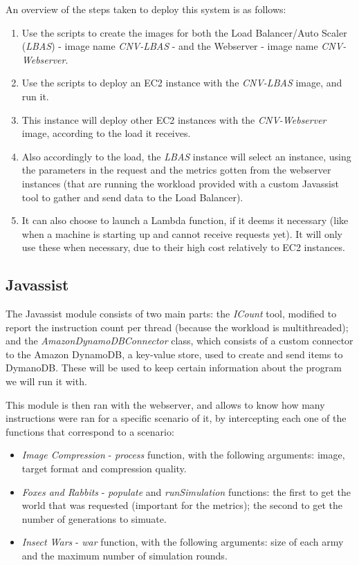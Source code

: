 \documentclass{article}
\begin{document}
An overview of the steps taken to deploy this system is as follows:

\begin{enumerate}
    \item Use the scripts to create the images for both the Load Balancer/Auto
        Scaler (\textit{LBAS}) - image name \textit{CNV-LBAS} - and the
        Webserver - image name \textit{CNV-Webserver}.
    \item Use the scripts to deploy an EC2 instance with the \textit{CNV-LBAS}
        image, and run it.
    \item This instance will deploy other EC2 instances with the
        \textit{CNV-Webserver} image, according to the load it receives.
    \item Also accordingly to the load, the \textit{LBAS} instance will select
        an instance, using the parameters in the request and the metrics gotten
        from the webserver instances (that are running the workload provided
        with a custom Javassist tool to gather and send data to the Load
        Balancer).
    \item It can also choose to launch a Lambda function, if it deems it
        necessary (like when a machine is starting up and cannot receive
        requests yet). It will only use these when necessary, due to their high
        cost relatively to EC2 instances.
\end{enumerate}

\subsection{Javassist}

The Javassist module consists of two main parts: the \textit{ICount} tool,
modified to report the instruction count per thread (because the workload is
multithreaded); and the \textit{AmazonDynamoDBConnector} class, which consists
of a custom connector to the Amazon DynamoDB, a key-value store, used to create
and send items to DymanoDB. These will be used to keep certain information about
the program we will run it with.

This module is then ran with the webserver, and allows to know how many
instructions were ran for a specific scenario of it, by intercepting each one of
the functions that correspond to a scenario:

\begin{itemize}
    \item \textit{Image Compression} - \textit{process} function, with the
        following arguments: image, target format and compression quality.
    \item \textit{Foxes and Rabbits} - \textit{populate} and
        \textit{runSimulation} functions: the first to get the world that was
        requested (important for the metrics); the second to get the number of
        generations to simuate.
    \item \textit{Insect Wars} - \textit{war} function, with the following
        arguments: size of each army and the maximum number of simulation
        rounds.
\end{itemize}
\end{document}
